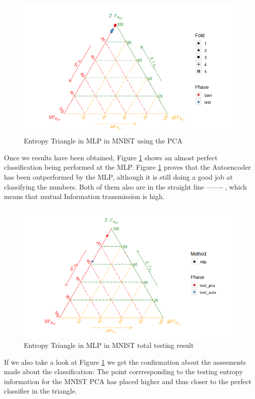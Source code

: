 \begin{figure}[H]
	\centering
	\includegraphics[width=1\linewidth]{Figuras_tfg/MNIST_PCA_mlp}
	\caption{Entropy Triangle in MLP in MNIST using the PCA}
	\label{fig:figure_MLP_MNIS_ET_PCA}
\end{figure}

Once we results have been obtained, Figure \ref{fig:figure_MLP_MNIS_ET_PCA} shows an almost perfect classification being performed at the MLP. Figure \ref{fig:figure_MLP_MNIS_ET_PCA} proves that the Autoencoder has been outperformed by the MLP, although it is still doing a good job at classifying the numbers. Both of them also are in the straight line ------- , which means that mutual Information transmission is high.

\begin{figure}[H]
	\centering
	\includegraphics[width=1\linewidth]{Figuras_tfg/MNIST_performance_test}
	\caption{Entropy Triangle in MLP in MNIST total testing result}
	\label{fig:figure_MLP_MNIS_ET_Total}
\end{figure}

If we also take a look at Figure \ref{fig:figure_MLP_MNIS_ET_PCA} we get the confirmation about the assesments made about the classification: The point corrresponding to the testing entropy information for the MNIST PCA has placed higher and thus closer to the perfect classifier in the triangle. \par

